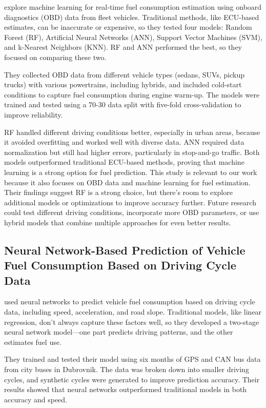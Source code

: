 \documentclass[letterpaper]{article}
\begin{document}
\cite{abediasl2024real} explore machine learning for real-time fuel consumption estimation
using onboard diagnostics (OBD) data from fleet vehicles. Traditional methods,
like ECU-based estimates, can be inaccurate or expensive, so they tested four
models: Random Forest (RF), Artificial Neural Networks (ANN), Support Vector
Machines (SVM), and k-Nearest Neighbors (KNN). RF and ANN performed the best, so
they focused on comparing these two. 

They collected OBD data from different
vehicle types (sedans, SUVs, pickup trucks) with various powertrains, including
hybrids, and included cold-start conditions to capture fuel consumption during
engine warm-up. The models were trained and tested using a 70-30 data split with
five-fold cross-validation to improve reliability. 

RF handled different driving
conditions better, especially in urban areas, because it avoided overfitting and
worked well with diverse data. ANN required data normalization but still had
higher errors, particularly in stop-and-go traffic. Both models outperformed
traditional ECU-based methods, proving that machine learning is a strong option
for fuel prediction. This study is relevant to our work because it also focuses
on OBD data and machine learning for fuel estimation. Their findings suggest RF
is a strong choice, but there's room to explore additional models or
optimizations to improve accuracy further. Future research could test different
driving conditions, incorporate more OBD parameters, or use hybrid models that
combine multiple approaches for even better results.

\subsection{Neural Network-Based Prediction of Vehicle Fuel Consumption Based on
Driving Cycle Data}

\cite{topic2022neural} used neural networks to predict vehicle fuel consumption based on
driving cycle data, including speed, acceleration, and road slope. Traditional
models, like linear regression, don't always capture these factors well, so they
developed a two-stage neural network model---one part predicts driving patterns,
and the other estimates fuel use. 

They trained and tested their model using six months of GPS and CAN bus data from city buses 
in Dubrovnik. The data was broken down into smaller driving cycles, and synthetic cycles 
were generated to improve prediction accuracy. Their results showed that neural networks 
outperformed traditional models in both accuracy and speed. 
\end{document}
